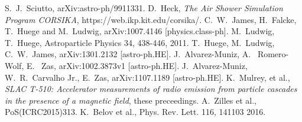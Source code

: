 \documentclass[epj]{webofc}
\begin{document}
%
% 
%
%
\begin{thebibliography}{}

S.~J.~Sciutto, arXiv:astro-ph/9911331.
%
D.~Heck, {\it The Air Shower Simulation Program CORSIKA}, https://web.ikp.kit.edu/corsika/.
%
C.~W.~James, H.~Falcke, T.~Huege and M.~Ludwig, arXiv:1007.4146 [physics.class-ph].
%
M.~Ludwig, T.~Huege, Astroparticle Physics 34, 438-446, 2011.
%
T.~Huege, M.~Ludwig, C.~W.~James, arXiv:1301.2132 [astro-ph.HE].
%
J.~Alvarez-Muniz, A.~ Romero-Wolf, E.~ Zas, arXiv:1002.3873v1 [astro-ph.HE].
%
J.~Alvarez-Muniz, W.~R.~Carvalho Jr., E.~Zas, arXiv:1107.1189 [astro-ph.HE].
% 
K.~Mulrey, et al., \textit{SLAC T-510: Accelerator measurements of radio emission from particle cascades in the presence of a magnetic field}, these preceedings.
%
A.~Zilles et al., PoS(ICRC2015)313.
%
K.~Belov et al., Phys. Rev. Lett. 116, 141103 2016.


\end{thebibliography}
\end{document}
